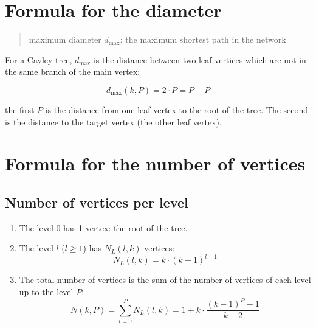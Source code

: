 \documentclass{article}
\newcommand{\Sum}[3]{\ensuremath{\displaystyle\sum\limits_{#1}^{#2} #3}}
\begin{document}
\section{Formula for the diameter}

\begin{quotation}
    maximum diameter $d_{\max}$: the maximum shortest path in the network
\end{quotation}

For a Cayley tree, $d_{\max}$ is the distance between two leaf vertices which are not in the same branch of the main vertex:

\begin{equation}
    d_{\max}(k, P) = 2 \cdot P = P + P
\end{equation}

the first $P$ is the distance from one leaf vertex to the root of the tree. The second is the distance to the target vertex (the other leaf vertex).

\section{Formula for the number of vertices}

\subsection{Number of vertices per level}

\begin{enumerate}
    \item The level 0 has 1 vertex: the root of the tree.
    \item The level $l$ ($l \geq 1$) has $N_L(l, k)$ vertices:
        \begin{equation}
            N_L(l, k) = k \cdot {\left(k - 1\right)}^{l - 1}
        \end{equation}
    \item The total number of vertices is the sum of the number of vertices of each level up to the level $P$:
        \begin{equation}
            N(k,P) = \Sum{i = 0}{P}{N_L(l,k)} = 1 + k \cdot \dfrac{{\left(k - 1\right)}^{P} - 1}{k - 2}
        \end{equation}
\end{enumerate}
\end{document}
